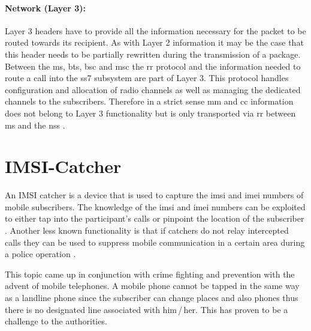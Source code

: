 \paragraph{Network (Layer 3):} Layer 3 headers have to provide all the information necessary for the packet to be routed towards its recipient.
As with Layer 2 information it may be the case that this header needs to be partially rewritten during the transmission of a package.
Between the \gls{ms}, \gls{bts}, \gls{bsc} and \gls{msc} the \gls{rr} protocol and the information needed to route a call into the \gls{ss7} subsystem are part of Layer 3.
This protocol handles configuration and allocation of radio channels as well as managing the dedicated channels to the subscribers.
Therefore in a strict sense \gls{mm} and \gls{cc} information does not belong to Layer 3 functionality but is only transported via \gls{rr} between \gls{ms} and the \gls{nss} \cite{protocols1999}.

\section{IMSI-Catcher}
\label{sec:catcher}
An IMSI catcher is a device that is used to capture the \gls{imsi} and \gls{imei} numbers of mobile subscribers.
The knowledge of the \gls{imsi} and \gls{imei} numbers can be exploited to either tap into the participant's calls or pinpoint the location of the subscriber \cite{fox}.
Another less known functionality is that if catchers do not relay intercepted calls they can be used to suppress mobile communication in a certain area \eg during a police operation \cite{imsi_wiki}.

This topic came up in conjunction with crime fighting and prevention with the advent of mobile telephones.
A mobile phone cannot be tapped in the same way as a landline phone since the subscriber can change places and also phones thus there is no designated line associated with him\,/\,her.
This has proven to be a challenge to the authorities.

